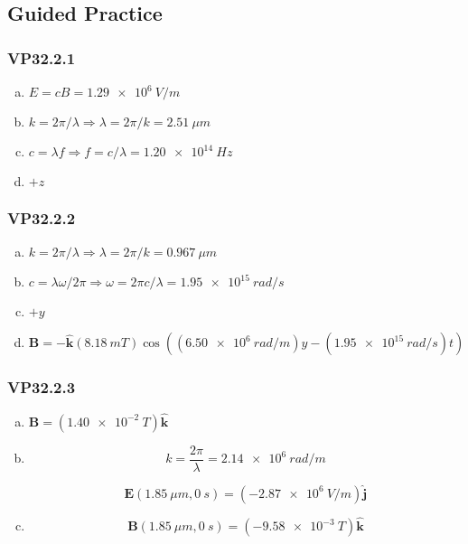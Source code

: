 \documentclass{article}
\begin{document}
\subsection{Guided Practice}

\subsubsection{VP32.2.1}

\begin{enumerate}[(a)]
  \item $E = c B = \qty{1.29e6}{V/m}$

  \item $k = 2 \pi / \lambda \Rightarrow \lambda = 2 \pi / k = \qty{2.51}{\mu m}$

  \item $c = \lambda f \Rightarrow f = c / \lambda = \qty{1.20e14}{Hz}$

  \item $+z$
\end{enumerate}

\subsubsection{VP32.2.2}

\begin{enumerate}[(a)]
  \item $k = 2 \pi / \lambda \Rightarrow \lambda = 2 \pi / k = \qty{0.967}{\mu m}$

  \item $c = \lambda \omega / 2 \pi \Rightarrow \omega = 2 \pi c / \lambda = \qty{1.95e15}{rad/s}$

  \item $+y$

  \item $\mathbf{B} = -\hat{\mathbf{k}} (\qty{8.18}{mT}) \cos ((\qty{6.50e6}{rad/m}) y - (\qty{1.95e15}{rad/s}) t)$
\end{enumerate}

\subsubsection{VP32.2.3}

\begin{enumerate}[(a)]
  \item $\mathbf{B} = (\qty{1.40e-2}{T}) \hat{\mathbf{k}}$

  \item

        \[k = \frac{2 \pi}{\lambda} = \qty{2.14e6}{rad/m}\]

        \[\mathbf{E}(\qty{1.85}{\mu m}, \qty{0}{s}) = (\qty{-2.87e6}{V/m}) \hat{\mathbf{j}}\]

  \item \[\mathbf{B}(\qty{1.85}{\mu m}, \qty{0}{s}) = (\qty{-9.58e-3}{T}) \hat{\mathbf{k}}\]
\end{enumerate}
\end{document}
